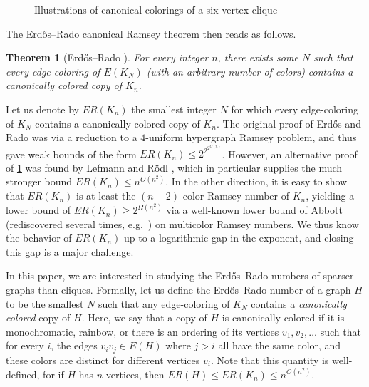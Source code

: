 \documentclass[a4paper,11pt]{article}
\newtheorem{theorem}{\bf Theorem}[section]
\theoremstyle{definition}
\begin{document}
\begin{figure}[ht]
\begin{minipage}{0.33\textwidth}
\end{minipage}
\caption{Illustrations of canonical colorings of a six-vertex clique}
\end{figure}
The Erd\H os--Rado canonical Ramsey theorem then reads as follows.
\begin{theorem}[Erd\H os--Rado \cite{ER50}]\label{thm:ER}
    For every integer $n$, there exists some $N$ such that every edge-coloring of $E(K_N)$ (with an arbitrary number of colors) contains a canonically colored copy of $K_n$. 
\end{theorem}
Let us denote by $ER(K_n)$ the smallest integer $N$ for which every edge-coloring of $K_N$ contains a canonically colored copy of $K_n$. The original proof of Erd\H os and Rado \cite{ER50} was via a reduction to a $4$-uniform hypergraph Ramsey problem, and thus gave weak bounds of the form $ER(K_n) \leq 2^{2^{2^{O(n)}}}$. However, an alternative proof of \cref{thm:ER} was found by Lefmann and R\"odl \cite{LR95}, which in particular supplies the much stronger bound $ER(K_n)\leq n^{O(n^2)}$. In the other direction, it is easy to show that $ER(K_n)$ is at least the $(n-2)$-color Ramsey number of $K_n$, yielding a lower bound of $ER(K_n) \geq 2^{\Omega(n^2)}$ via a well-known lower bound of Abbott \cite{MR0314673} (rediscovered several times, e.g.\ \cite{MR0932230,MR0316290}) on multicolor Ramsey numbers. We thus know the behavior of $ER(K_n)$ up to a logarithmic gap in the exponent, and closing this gap is a major challenge.

In this paper, we are interested in studying the Erd\H os--Rado numbers of sparser graphs than cliques. Formally, let us define the Erd\H os--Rado number of a graph $H$ to be the smallest $N$ such that any edge-coloring of $K_N$ contains a {\em canonically colored} copy of $H$. Here, we say that a copy of $H$ is canonically colored if it is monochromatic, rainbow, or there is an ordering of its vertices $v_1, v_2, \dots$ such that for every $i$, the edges $v_iv_j\in E(H)$ where $j>i$ all have the same color, and these colors are distinct for different vertices $v_i$. Note that this quantity is well-defined, for if $H$ has $n$ vertices, then $ER(H) \leq ER(K_n) \leq n^{O(n^2)}$.
\end{document}

